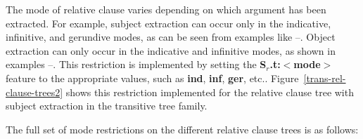 The mode of relative clause varies depending on which argument has been
extracted. For example, subject extraction can occur only in the
indicative, infinitive, and gerundive modes, as can be seen from examples
like --. Object extraction can only occur in the indicative and
infinitive modes, as shown in examples --. This restriction is
implemented by setting the {\bf S$_r$.t:$<$mode$>$} feature to the
appropriate values, such as {\bf ind}, {\bf inf}, {\bf ger},
etc.. Figure~\ref{trans-rel-clause-trees2} shows this restriction
implemented for the relative clause tree with subject extraction in the
transitive tree family.


\noindent
{}

The full set of mode restrictions on the different relative clause trees is
as follows:

